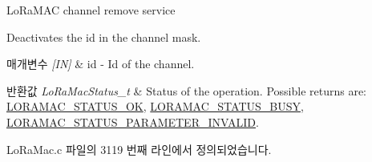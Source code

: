 Lo\+Ra\+M\+AC channel remove service 

Deactivates the id in the channel mask.


\begin{DoxyParams}{매개변수}
{\em \mbox{[}\+I\+N\mbox{]}} & id -\/ Id of the channel.\\
\hline
\end{DoxyParams}

\begin{DoxyRetVals}{반환값}
{\em Lo\+Ra\+Mac\+Status\+\_\+t} & Status of the operation. Possible returns are\+: \mbox{\hyperlink{group___l_o_r_a_m_a_c_gga1d18f26b344040b3ec5c3db662919661a03db5fca052313edb3823c014b653a74}{L\+O\+R\+A\+M\+A\+C\+\_\+\+S\+T\+A\+T\+U\+S\+\_\+\+OK}}, \mbox{\hyperlink{group___l_o_r_a_m_a_c_gga1d18f26b344040b3ec5c3db662919661a66b12f569207eacd97ee1c1d6c4cee6d}{L\+O\+R\+A\+M\+A\+C\+\_\+\+S\+T\+A\+T\+U\+S\+\_\+\+B\+U\+SY}}, \mbox{\hyperlink{group___l_o_r_a_m_a_c_gga1d18f26b344040b3ec5c3db662919661ad0d3119f247d00e1787dda106fcb3017}{L\+O\+R\+A\+M\+A\+C\+\_\+\+S\+T\+A\+T\+U\+S\+\_\+\+P\+A\+R\+A\+M\+E\+T\+E\+R\+\_\+\+I\+N\+V\+A\+L\+ID}}. \\
\hline
\end{DoxyRetVals}


Lo\+Ra\+Mac.\+c 파일의 3119 번째 라인에서 정의되었습니다.


